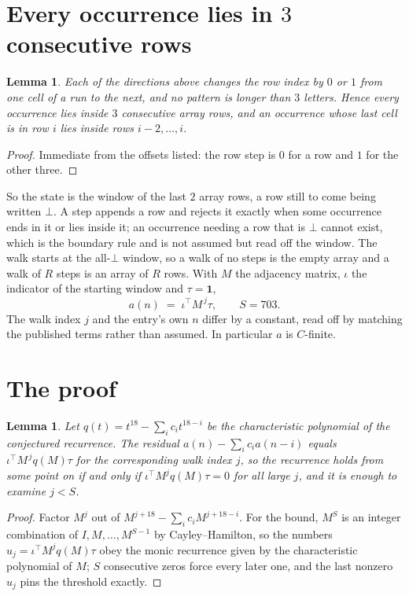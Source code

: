 \documentclass[11pt,a4paper]{article}
\theoremstyle{plain}
\newtheorem{lemma}[theorem]{Lemma}
\theoremstyle{definition}
\begin{document}
\section{Every occurrence lies in $3$ consecutive rows}

\begin{lemma}\label{lem:win}
Each of the directions above changes the row index by $0$ or $1$ from one cell of a run to the
next, and no pattern is longer than $3$ letters. Hence every occurrence lies inside $3$
consecutive array rows, and an occurrence whose last cell is in row $i$ lies inside rows
$i-2,\dots,i$.
\end{lemma}

\begin{proof}
Immediate from the offsets listed: the row step is $0$ for a row and $1$ for the other three.
\end{proof}

So the state is the window of the last $2$ array rows, a row still to come being written
$\bot$. A step appends a row and rejects it exactly when some occurrence ends in it or lies
inside it; an occurrence needing a row that is $\bot$ cannot exist, which is the boundary rule
and is not assumed but read off the window. The walk starts at the all-$\bot$ window, so a walk
of no steps is the empty array and a walk of $R$ steps is an array of $R$ rows. With $M$ the
adjacency matrix, $\iota$ the indicator of the starting window and $\tau=\mathbf{1}$,
\[
a(n)\;=\;\iota^{\!\top}M^{\,j}\tau ,\qquad S=703.
\]
The walk index $j$ and the entry's own $n$ differ by a constant, read off by matching the
published terms rather than assumed. In particular $a$ is $C$-finite.

\section{The proof}

\begin{lemma}\label{lem:crit}
Let $q(t)=t^{18}-\sum_i c_it^{18-i}$ be the characteristic polynomial of the
conjectured recurrence. The residual $a(n)-\sum_ic_ia(n-i)$ equals
$\iota^{\!\top}M^{\,j}q(M)\tau$ for the corresponding walk index $j$, so the recurrence
holds from some point on if and only if $\iota^{\!\top}M^{j}q(M)\tau=0$ for all large $j$,
and it is enough to examine $j<S$.
\end{lemma}

\begin{proof}
Factor $M^{j}$ out of $M^{j+18}-\sum_ic_iM^{j+18-i}$. For the bound, $M^{S}$
is an integer combination of $I,M,\dots,M^{S-1}$ by Cayley--Hamilton, so the numbers
$u_j=\iota^{\!\top}M^{j}q(M)\tau$ obey the monic recurrence given by the characteristic
polynomial of $M$; $S$ consecutive zeros force every later one, and the last nonzero $u_j$
pins the threshold exactly.
\end{proof}
\end{document}
